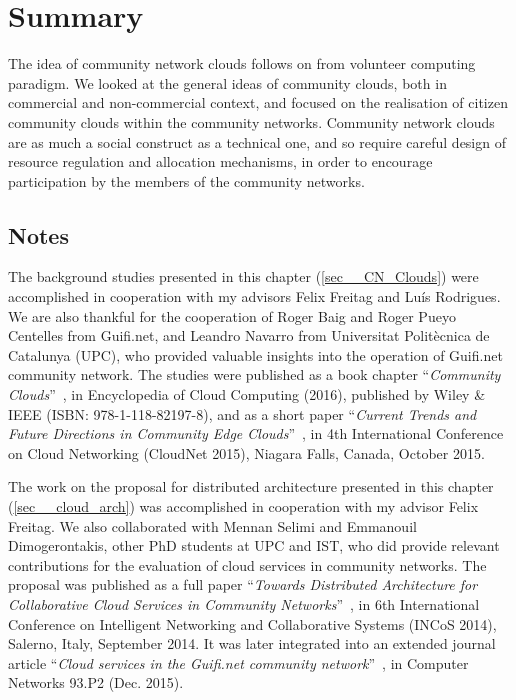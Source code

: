 
\section{Summary}
\label{sec__related_work_conclusion}

The idea of community network clouds follows on from volunteer computing paradigm.
We looked at the general ideas of community clouds, both in commercial and non-commercial context,
and focused on the realisation of citizen community clouds within the community networks.
Community network clouds are as much a social construct as a technical one,
and so require careful design of resource regulation and allocation mechanisms,
in order to encourage participation by the members of the community networks.


\subsection*{Notes}

The background studies presented in this chapter (\cref{sec__CN_Clouds}) 
were accomplished in cooperation with my advisors Felix Freitag and Luís Rodrigues.
We are also thankful for the cooperation of Roger Baig and Roger Pueyo Centelles from Guifi.net, 
and Leandro Navarro from Universitat Politècnica de Catalunya (UPC),
who provided valuable insights into the operation of Guifi.net community network.
The studies were published as a book chapter 
	\enquote{\emph{Community Clouds}}~\cite{Khan2015CommunityClouds}, 
	in Encyclopedia of Cloud Computing (2016), published by Wiley \& IEEE (ISBN: 978-1-118-82197-8),
and as a short paper \enquote{\emph{Current Trends and Future Directions in Community Edge Clouds}}~\cite{Khan2015Current}, 
	in 4th International Conference on Cloud Networking (CloudNet 2015),
	Niagara Falls, Canada, October 2015.

The work on the proposal for distributed architecture presented in this chapter (\cref{sec__cloud_arch}) 
was accomplished in cooperation with my advisor Felix Freitag. 
We also collaborated with Mennan Selimi and Emmanouil Dimogerontakis, other PhD students at UPC and IST, 
who did provide relevant contributions for the evaluation of cloud services in community networks.
The proposal was published as a full paper
	\enquote{\emph{Towards Distributed Architecture for Collaborative Cloud Services in Community Networks}}~\cite{Khan2014Architecture},
	in 6th International Conference on Intelligent Networking and Collaborative Systems (INCoS 2014),
	Salerno, Italy, September 2014.
It was later integrated into an extended journal article
	\enquote{\emph{Cloud services in the Guifi.net community network}}~\cite{Selimi2015Cloud},
	in Computer Networks 93.P2 (Dec. 2015).
